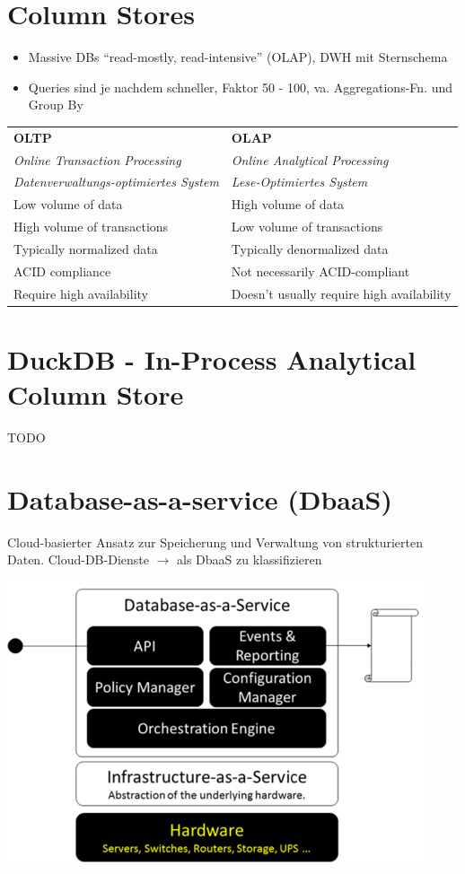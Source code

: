 \documentclass[a4paper, landscape, 8pt]{scrartcl}
\begin{document}
\begin{multicols*}{4}
        \section{Column Stores}
        \begin{itemize}
            \item Massive DBs \enquote{read-mostly, read-intensive} (OLAP), DWH mit Sternschema
            \item Queries sind je nachdem schneller, Faktor 50 - 100, va. Aggregations-Fn. und Group By
        \end{itemize}
        \begin{tabularx}{\columnwidth}{X | X}
            \textbf{OLTP} & \textbf{OLAP} \\
            \textit{Online Transaction Processing} & \textit{Online Analytical Processing} \\
            \textit{Datenverwaltungs-optimiertes System} & \textit{Lese-Optimiertes System} \\
            \hline
            Low volume of data & High volume of data \\
            \hline
            High volume of transactions & Low volume of transactions \\
            \hline
            Typically normalized data & Typically denormalized data \\
            \hline
            ACID compliance & Not necessarily ACID-compliant \\
            \hline
            Require high availability & Doesn't usually require high availability
        \end{tabularx}

        \section{DuckDB - In-Process Analytical Column Store}
        TODO

        \section{Database-as-a-service (DbaaS)}
        Cloud-basierter Ansatz zur Speicherung und Verwaltung von strukturierten Daten.
        Cloud-DB-Dienste $\to$ als DbaaS zu klassifizieren

        \includegraphics[scale=0.3]{graphic/14-dbaas-setup}


\end{multicols*}
\end{document}
